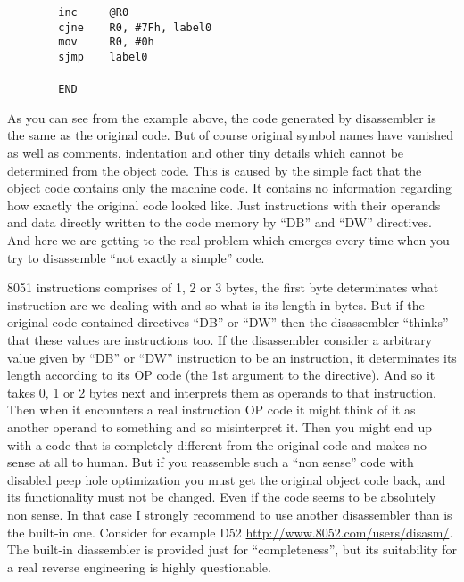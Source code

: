 \documentclass[a4paper,twoside,12pt]{book}
\begin{document}
\begin{minipage}{\textwidth}
\begin{minipage}[t]{.4\textwidth}
			\verb'        '{\color{highlight_instruction}\verb'inc'}\verb'     '{\color{highlight_indirect}\verb'@R0'}\\
			\verb'        '{\color{highlight_instruction}\verb'cjne'}\verb'    '{\color{highlight_sfr}\verb'R0'}{\color{highlight_oper_sep}\verb','}\verb' '{\color{highlight_imm_hex}\verb'#7Fh'}{\color{highlight_oper_sep}\verb','}\verb' '{\color{highlight_constant}\verb'label0'}\\
			\verb'        '{\color{highlight_instruction}\verb'mov'}\verb'     '{\color{highlight_sfr}\verb'R0'}{\color{highlight_oper_sep}\verb','}\verb' '{\color{highlight_imm_hex}\verb'#0h'}\\
			\verb'        '{\color{highlight_instruction}\verb'sjmp'}\verb'    '{\color{highlight_constant}\verb'label0'}\\
			\verb''\\
			\verb'        '{\color{highlight_directive}\verb'END'}\\
		\end{minipage}
		\onecolumn
	\end{minipage}

	As you can see from the example above, the code generated by disassembler is the same as the original code. But of course original symbol names have vanished as well as comments, indentation and other tiny details which cannot be determined from the object code. This is caused by the simple fact that the object code contains only the machine code. It contains no information regarding how exactly the original code looked like. Just instructions with their operands and data directly written to the code memory by ``DB'' and ``DW'' directives. And here we are getting to the real problem which emerges every time when you try to disassemble ``not exactly a simple'' code.

	8051 instructions comprises of 1, 2 or 3 bytes, the first byte determinates what instruction are we dealing with and so what is its length in bytes. But if the original code contained directives ``DB'' or ``DW'' then the disassembler ``thinks'' that these values are instructions too. If the disassembler consider a arbitrary value given by ``DB'' or ``DW'' instruction to be an instruction, it determinates its length according to its OP code (the 1st argument to the directive). And so it takes 0, 1 or 2 bytes next and interprets them as operands to that instruction. Then when it encounters a real instruction OP code it might think of it as another operand to something and so misinterpret it. Then you might end up with a code that is completely different from the original code and makes no sense at all to human. But if you reassemble such a ``non sense'' code with disabled peep hole optimization you must get the original object code back, and its functionality must not be changed. Even if the code seems to be absolutely non sense. In that case I strongly recommend to use another disassembler than is the built-in one. Consider for example D52 \url{http://www.8052.com/users/disasm/}. The built-in diassembler is provided just for ``completeness'', but its suitability for a real reverse engineering is highly questionable.
\end{document}
